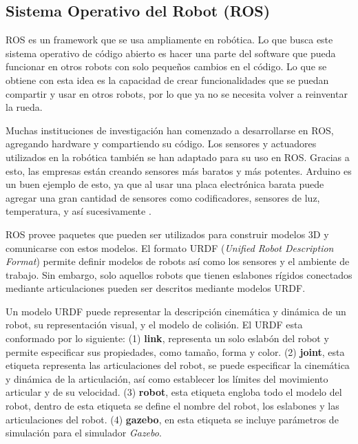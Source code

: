 \subsection{Sistema Operativo del Robot (ROS)}
ROS es un framework que se usa ampliamente en rob\'otica. Lo que busca este sistema 
operativo de código abierto es hacer una parte del software que pueda funcionar en 
otros robots con solo pequeños cambios en el código. Lo que se obtiene con esta idea 
es la capacidad de crear funcionalidades que se puedan compartir y usar en otros robots, por 
lo que ya no se necesita volver a reinventar la rueda.

Muchas instituciones de investigaci\'on han comenzado a desarrollarse en 
ROS, agregando hardware y compartiendo su c\'odigo. Los sensores y actuadores 
utilizados en la rob\'otica tambi\'en se han adaptado para su uso en ROS. Gracias 
a esto, las empresas est\'an creando sensores m\'as baratos y m\'as potentes. Arduino 
es un buen ejemplo de esto, ya que al usar una placa electr\'onica barata puede 
agregar una gran cantidad de sensores como codificadores, sensores de luz, 
temperatura, y as\'i sucesivamente \cite{rosIntroduction}.

ROS provee paquetes que pueden ser utilizados para construir modelos 3D y comunicarse 
con estos modelos. El formato URDF (\textit{Unified Robot Description Format}) permite 
definir modelos de robots así como los sensores y el ambiente de trabajo. Sin embargo, solo 
aquellos robots que tienen eslabones rígidos conectados mediante articulaciones pueden ser 
descritos mediante modelos URDF.

Un modelo URDF puede representar la descripción cinemática y dinámica de un robot, su 
representación visual, y el modelo de colisión. El URDF esta conformado por lo siguiente: 
(1) \textbf{link}, representa un solo eslabón del robot y permite especificar sus propiedades, 
como tamaño, forma y color. (2) \textbf{joint}, esta etiqueta representa las articulaciones del 
robot, se puede especificar la cinemática y dinámica de la articulación, así como establecer 
los límites del movimiento articular y de su velocidad. (3) \textbf{robot}, esta etiqueta 
engloba todo el modelo del robot, dentro de esta etiqueta se define el nombre del robot, los 
eslabones y las articulaciones del robot. (4) \textbf{gazebo}, en esta etiqueta se incluye 
parámetros de simulación para el simulador \textit{Gazebo}.



